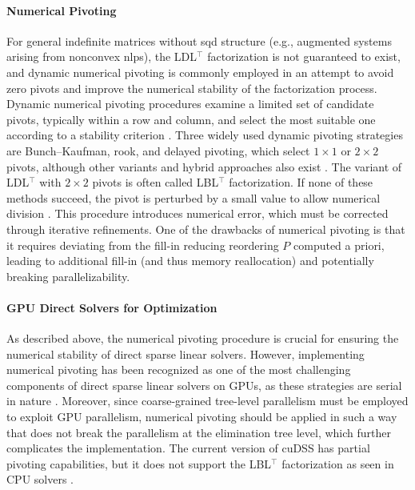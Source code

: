 \documentclass{article}
\begin{document}
\paragraph{Numerical Pivoting}

For general indefinite matrices without \gls*{sqd} structure (e.g., augmented systems \cite{wachterImplementationInteriorpointFilter2006} arising from nonconvex \glspl*{nlp}), the LDL$^\top$ factorization is not guaranteed to exist, and dynamic numerical pivoting is commonly employed in an attempt to avoid zero pivots and improve the numerical stability of the factorization process.
Dynamic numerical pivoting procedures examine a limited set of candidate pivots, typically within a row and column, and select the most suitable one according to a stability criterion \cite{schenkFASTFACTORIZATIONPIVOTING}.
Three widely used dynamic pivoting strategies are Bunch–Kaufman, rook, and delayed pivoting, which select $1 \times 1$ or $2 \times 2$ pivots, although other variants and hybrid approaches also exist \cite{duff2017}.
The variant of LDL$^\top$ with $2 \times 2$ pivots is often called LBL$^\top$ factorization.
If none of these methods succeed, the pivot is perturbed by a small value to allow numerical division \cite{schenkFASTFACTORIZATIONPIVOTING}.
This procedure introduces numerical error, which must be corrected through iterative refinements.
One of the drawbacks of numerical pivoting is that it requires deviating from the fill-in reducing reordering $P$ computed a priori, leading to additional fill-in (and thus memory reallocation) and potentially breaking parallelizability.


\paragraph{GPU Direct Solvers for Optimization}
As described above, the numerical pivoting procedure is crucial for ensuring the numerical stability of direct sparse linear solvers.
However, implementing numerical pivoting has been recognized as one of the most challenging components of direct sparse linear solvers on GPUs, as these strategies are serial in nature \cite{swirydowiczLinearSolversPower2022}.
Moreover, since coarse-grained tree-level parallelism must be employed to exploit GPU parallelism, numerical pivoting should be applied in such a way that does not break the parallelism at the elimination tree level, which further complicates the implementation.
The current version of cuDSS has partial pivoting capabilities, but it does not support the LBL$^\top$ factorization as seen in CPU solvers \cite{nvidiaNVIDIACuDSSPreview}.
\end{document}
